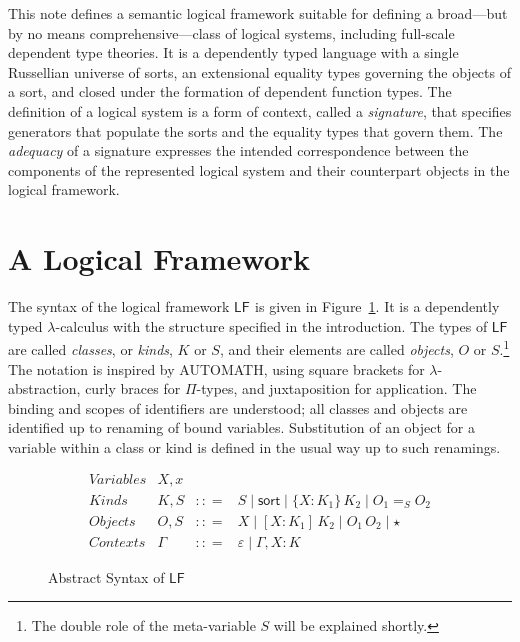 \documentclass[11pt,twoside]{article}
\newcommand{\braces}[1]{\{#1\}}
\newcommand{\bracks}[1]{[#1]}
\newcommand{\LF}[1][]{\ensuremath{\mathsf{LF}_{#1}}}
\newcommand{\bnfdef}{\mathrel{{:}{:}{=}}}
\newcommand{\bnfalt}{\mathrel{\mid}}
\newcommand{\sortclass}{\ensuremath{\textsf{sort}}}
\newcommand{\eqclass}[3]{{#2}=_{#1}{#3}}
\newcommand{\piclass}[3]{\braces{{#2}\mathbin{:}{#1}}\,{#3}}
\newcommand{\lamobj}[3]{\bracks{{#2}\mathbin{:}{#1}}\,{#3}}
\newcommand{\appobj}[2]{{#1}\,{#2}}
\newcommand{\selfobj}{\star}
\newcommand{\empctx}{\varepsilon}
\newcommand{\snocctx}[3]{{#1}\mathbin{,}{#2}{:}{#3}}
\begin{document}
This note defines a semantic logical framework suitable for defining a broad---but by no
means comprehensive---class of logical systems, including full-scale dependent type
theories.  It is a dependently typed language with a single Russellian universe of sorts,
an extensional equality types governing the objects of a sort, and closed under the
formation of dependent function types.  The definition of a logical system is a form of
context, called a \emph{signature}, that specifies generators that populate the sorts and
the equality types that govern them.  The \emph{adequacy} of a signature expresses the
intended correspondence between the components of the represented logical system and their
counterpart objects in the logical framework.

\section{A Logical Framework}

The syntax of the logical framework \LF{} is given in Figure~\ref{fig:lf-syntax}.  It is a
dependently typed $\lambda$-calculus with the structure specified in the introduction.  The
types of \LF{} are called \emph{classes}, or \emph{kinds}, $K$ or $S$, and their elements
are called \emph{objects}, $O$ or $S$.\footnote{The double role of the meta-variable $S$
  will be explained shortly.}  The notation is inspired by \textsf{AUTOMATH}, using square
brackets for $\lambda$-abstraction, curly braces for $\Pi$-types, and juxtaposition for
application.  The binding and scopes of identifiers are understood; all classes and
objects are identified up to renaming of bound variables.  Substitution of an object for a
variable within a class or kind is defined in the usual way up to such renamings.

\begin{figure}[tp]
  
  \begin{displaymath}
    \begin{array}{lrcl}
      \textit{Variables} & X,x \\
      \textit{Kinds} & K, S & \bnfdef{} & S \bnfalt \sortclass \bnfalt \piclass{K_{1}}{X}{K_{2}}
                                          \bnfalt \eqclass{S}{O_{1}}{O_{2}} \\
      \textit{Objects} & O, S & \bnfdef & X \bnfalt \lamobj{K_{1}}{X}{K_{2}} \bnfalt
                                          \appobj{O_{1}}{O_{2}} \bnfalt \selfobj{} \\
      \textit{Contexts} & \Gamma & \bnfdef & \empctx{} \bnfalt \snocctx{\Gamma}{X}{K}
    \end{array}
  \end{displaymath}

  \caption{Abstract Syntax of \LF{}}
  \label{fig:lf-syntax}
\end{figure}
\end{document}

